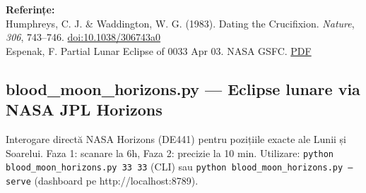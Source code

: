 \documentclass[12pt,a4paper,twoside,openany]{book}
\begin{document}
\begin{infobox}

\textbf{Referințe:} \\

Humphreys, C. J. \& Waddington, W. G. (1983). Dating the Crucifixion. \textit{Nature}, \textit{306}, 743–746. \href{https://www.nature.com/articles/306743a0}{doi:10.1038/306743a0} \\

Espenak, F. Partial Lunar Eclipse of 0033 Apr 03. NASA GSFC. \href{https://eclipse.gsfc.nasa.gov/LEhistory/LEplot/LE0033Apr03P.pdf}{PDF}

\end{infobox}


\subsection{blood\_moon\_horizons.py — Eclipse lunare via NASA JPL Horizons}
Interogare directă NASA Horizons (DE441) pentru pozițiile exacte ale Lunii și Soarelui. Faza 1: scanare la 6h, Faza 2: precizie la 10 min. Utilizare: \texttt{python blood\_moon\_horizons.py 33 33} (CLI) sau \texttt{python blood\_moon\_horizons.py --serve} (dashboard pe http://localhost:8789).
\end{document}
